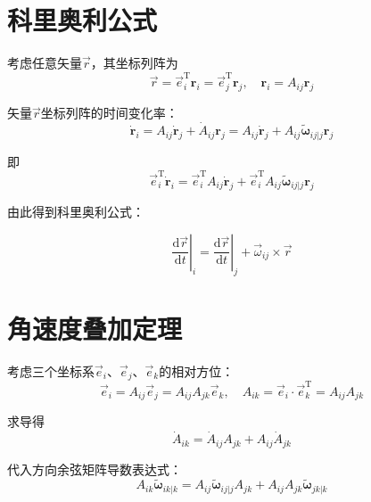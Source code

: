 \section{科里奥利公式}

考虑任意矢量$\vec{r}$，其坐标列阵为
\begin{equation}
\vec{r} = \vec{e}_i^{\mathrm{T}}\boldsymbol{r}_i = \vec{e}_j^{\mathrm{T}}\boldsymbol{r}_j, \quad \boldsymbol{r}_i = A_{ij}\boldsymbol{r}_j
\end{equation}

矢量$\vec{r}$坐标列阵的时间变化率：
\begin{equation}
\dot{\boldsymbol{r}}_i = A_{ij}\dot{\boldsymbol{r}}_j + \dot{A}_{ij}\boldsymbol{r}_j
= A_{ij}\dot{\boldsymbol{r}}_j + A_{ij}\tilde{\boldsymbol{\omega}}_{ij|j}\boldsymbol{r}_j
\end{equation}

即
\begin{equation}
\vec{e}_i^{\mathrm{T}}\dot{\boldsymbol{r}}_i = \vec{e}_i^{\mathrm{T}}A_{ij}\dot{\boldsymbol{r}}_j + \vec{e}_i^{\mathrm{T}}A_{ij}\tilde{\boldsymbol{\omega}}_{ij|j}\boldsymbol{r}_j
\end{equation}

由此得到科里奥利公式：
\begin{myformula}
\begin{equation}
\left.\frac{\mathrm{d}\vec{r}}{\mathrm{d}t}\right|_{i}
= \left.\frac{\mathrm{d}\vec{r}}{\mathrm{d}t}\right|_{j}
+ \vec{\omega}_{ij} \times \vec{r}
\label{eq:6.4}
\end{equation}
\end{myformula}

\section{角速度叠加定理}

考虑三个坐标系$\vec{e}_i$、$\vec{e}_j$、$\vec{e}_k$的相对方位：
\begin{equation}
\vec{e}_i = A_{ij}\vec{e}_j = A_{ij}A_{jk}\vec{e}_k, \quad A_{ik} = \vec{e}_i\cdot\vec{e}_k^{\mathrm{T}} = A_{ij}A_{jk}
\end{equation}

求导得
\begin{equation}
\dot{A}_{ik} = \dot{A}_{ij}A_{jk} + A_{ij}\dot{A}_{jk}
\end{equation}

代入方向余弦矩阵导数表达式：
\begin{equation}
A_{ik}\tilde{\boldsymbol{\omega}}_{ik|k} = A_{ij}\tilde{\boldsymbol{\omega}}_{ij|j}A_{jk} + A_{ij}A_{jk}\tilde{\boldsymbol{\omega}}_{jk|k}
\end{equation}

